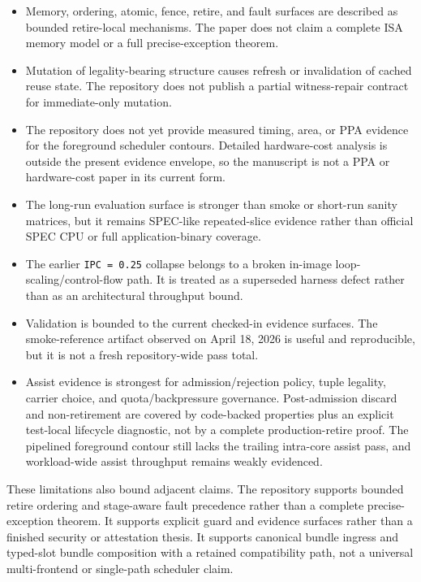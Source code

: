 \documentclass[twocolumn]{article}
\begin{document}
\begin{itemize}
\item Memory, ordering, atomic, fence, retire, and fault surfaces are described as bounded retire-local mechanisms. The paper does not claim a complete ISA memory model or a full precise-exception theorem.
\item Mutation of legality-bearing structure causes refresh or invalidation of cached reuse state. The repository does not publish a partial witness-repair contract for immediate-only mutation.
\item The repository does not yet provide measured timing, area, or PPA evidence for the foreground scheduler contours. Detailed hardware-cost analysis is outside the present evidence envelope, so the manuscript is not a PPA or hardware-cost paper in its current form.
\item The long-run evaluation surface is stronger than smoke or short-run sanity matrices, but it remains SPEC-like repeated-slice evidence rather than official SPEC CPU or full application-binary coverage.
\item The earlier \texttt{IPC = 0.25} collapse belongs to a broken in-image loop-scaling/control-flow path. It is treated as a superseded harness defect rather than as an architectural throughput bound.
\item Validation is bounded to the current checked-in evidence surfaces. The smoke-reference artifact observed on April 18, 2026 is useful and reproducible, but it is not a fresh repository-wide pass total.
\item Assist evidence is strongest for admission/rejection policy, tuple legality, carrier choice, and quota/backpressure governance. Post-admission discard and non-retirement are covered by code-backed properties plus an explicit test-local lifecycle diagnostic, not by a complete production-retire proof. The pipelined foreground contour still lacks the trailing intra-core assist pass, and workload-wide assist throughput remains weakly evidenced.
\end{itemize}

These limitations also bound adjacent claims. The repository supports bounded retire ordering and stage-aware fault precedence rather than a complete precise-exception theorem. It supports explicit guard and evidence surfaces rather than a finished security or attestation thesis. It supports canonical bundle ingress and typed-slot bundle composition with a retained compatibility path, not a universal multi-frontend or single-path scheduler claim.
\end{document}
